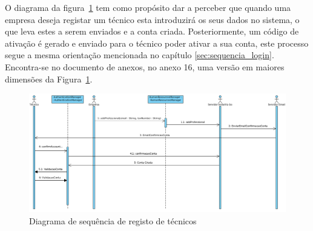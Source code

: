 O diagrama da figura~\ref{fig:45} tem como propósito dar a perceber que quando uma empresa deseja registar um técnico esta introduzirá os seus dados no sistema, o que leva estes a serem enviados e a conta criada. Posteriormente, um código de ativação é gerado e enviado para o técnico poder ativar a sua conta, este processo segue a mesma orientação mencionada no capítulo \ref{sec:sequencia_login}. Encontra-se no documento de anexos, no anexo 16, uma versão em maiores dimensões da Figura~\ref*{fig:45}.


\begin{figure}[htb]
  \centering
  \includegraphics[width=\textwidth]{images/diagramas/sequencia/registo_tecnico.png}
  \caption{Diagrama de sequência de registo de técnicos}
  \label{fig:45}
\end{figure}